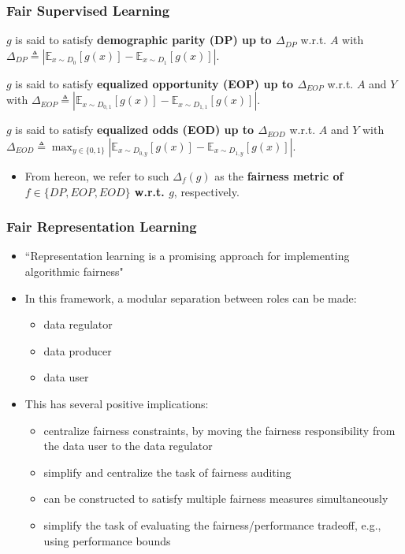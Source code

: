 \documentclass{beamer}
\begin{document}
	\begin{frame}
	\frametitle{Fair Supervised Learning}
		\begin{definition}
			$g$ is said to satisfy {\bf demographic parity (DP) up to $\Delta_{DP}$} w.r.t. $A$ with 
			$\Delta_{DP} \triangleq \left| \mathbb{E}_{x \sim D_0}[g(x)] - \mathbb{E}_{x \sim D_1}[g(x)] \right|$.
		\end{definition}
		
		\begin{definition}
			$g$ is said to satisfy {\bf equalized opportunity (EOP) up to $\Delta_{EOP}$} w.r.t. $A$ and $Y$ with
			$\Delta_{EOP} \triangleq \left| \mathbb{E}_{x \sim D_{0, 1}}[g(x)] - \mathbb{E}_{x \sim D_{1, 1}}[g(x)] \right|$.
		\end{definition}
	
		\begin{definition}
			$g$ is said to satisfy {\bf equalized odds (EOD) up to $\Delta_{EOD}$} w.r.t. $A$ and $Y$ with
			$\Delta_{EOD} \triangleq \max_{y \in \{0, 1\}} \left| \mathbb{E}_{x \sim D_{0, y}}[g(x)] - \mathbb{E}_{x \sim D_{1, y}}[g(x)] \right|$.
		\end{definition}
	
	\begin{itemize}
		\item From hereon, we refer to such $\Delta_{f}(g)$ as the {\bf fairness metric of $f \in \{DP, EOP, EOD\}$ w.r.t. $g$}, respectively.
	\end{itemize}
	\end{frame}


	\begin{frame}
	\frametitle{Fair Representation Learning}
	\begin{itemize}
		\item ``Representation learning is a promising approach for implementing algorithmic
		fairness" \cite{fair-representation-tutorial}
		
		\item In this framework, a modular separation between roles can be made:
		\begin{itemize}
			\item data regulator
			\item data producer
			\item data user
		\end{itemize}
		
		\item This has several positive implications:
		\begin{itemize}
			\item centralize fairness constraints, by moving the fairness responsibility from the data user to the data regulator
			\item simplify and centralize the task of fairness auditing
			\item can be constructed to satisfy multiple fairness measures simultaneously
			\item simplify the task of evaluating the fairness/performance tradeoff, e.g., using performance bounds
		\end{itemize}
	\end{itemize}
	\end{frame}
\end{document}

